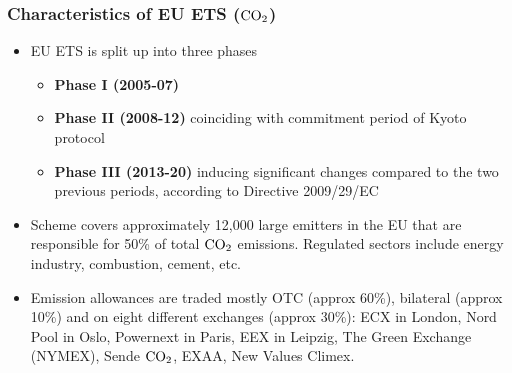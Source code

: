 \begin{frame}
  \frametitle{Characteristics of EU ETS ($\textnormal{CO}_2$)}
  \begin{itemize}
  \item<1-> EU ETS is split up into three phases
  \begin{itemize}
  \item \textbf{Phase I (2005-07)}
  \item \textbf{Phase II (2008-12)} coinciding with commitment period of Kyoto protocol
  \item \textbf{Phase III (2013-20)} inducing significant changes compared to the two previous periods, according to Directive 2009/29/EC
  \end{itemize}
  \item<2-> Scheme covers approximately 12,000 large emitters in the EU that are responsible for 50\% of total $\textnormal{CO}_2$ emissions. Regulated sectors include energy industry, combustion, cement, etc.
  \item<3->  Emission allowances are traded mostly OTC (approx 60\%), bilateral (approx 10\%) and on eight different exchanges (approx 30\%):
  ECX in London, Nord Pool in Oslo, Powernext in Paris, EEX in Leipzig, The Green Exchange (NYMEX), Sende $\textnormal{CO}_2$, EXAA, New Values Climex.
  \end{itemize}
  \end{frame}

